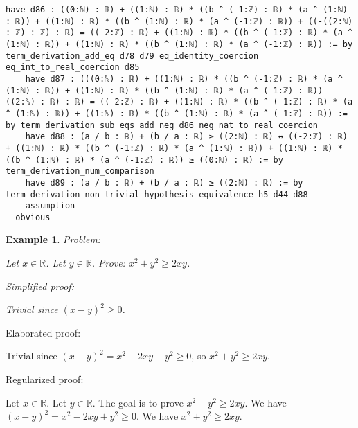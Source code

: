 \documentclass{article}
\newtheorem{example}{Example}
\begin{document}
\begin{tcolorbox}[colback=white!10, width=\linewidth]
\begin{lstlisting}[language=Lean4]
    have d86 : ((0:ℕ) : ℝ) + ((1:ℕ) : ℝ) * ((b ^ (-1:ℤ) : ℝ) * (a ^ (1:ℕ) : ℝ)) + ((1:ℕ) : ℝ) * ((b ^ (1:ℕ) : ℝ) * (a ^ (-1:ℤ) : ℝ)) + ((-((2:ℕ) : ℤ) : ℤ) : ℝ) = ((-2:ℤ) : ℝ) + ((1:ℕ) : ℝ) * ((b ^ (-1:ℤ) : ℝ) * (a ^ (1:ℕ) : ℝ)) + ((1:ℕ) : ℝ) * ((b ^ (1:ℕ) : ℝ) * (a ^ (-1:ℤ) : ℝ)) := by term_derivation_add_eq d78 d79 eq_identity_coercion eq_int_to_real_coercion d85
    have d87 : (((0:ℕ) : ℝ) + ((1:ℕ) : ℝ) * ((b ^ (-1:ℤ) : ℝ) * (a ^ (1:ℕ) : ℝ)) + ((1:ℕ) : ℝ) * ((b ^ (1:ℕ) : ℝ) * (a ^ (-1:ℤ) : ℝ)) - ((2:ℕ) : ℝ) : ℝ) = ((-2:ℤ) : ℝ) + ((1:ℕ) : ℝ) * ((b ^ (-1:ℤ) : ℝ) * (a ^ (1:ℕ) : ℝ)) + ((1:ℕ) : ℝ) * ((b ^ (1:ℕ) : ℝ) * (a ^ (-1:ℤ) : ℝ)) := by term_derivation_sub_eqs_add_neg d86 neg_nat_to_real_coercion
    have d88 : (a / b : ℝ) + (b / a : ℝ) ≥ ((2:ℕ) : ℝ) ↔ ((-2:ℤ) : ℝ) + ((1:ℕ) : ℝ) * ((b ^ (-1:ℤ) : ℝ) * (a ^ (1:ℕ) : ℝ)) + ((1:ℕ) : ℝ) * ((b ^ (1:ℕ) : ℝ) * (a ^ (-1:ℤ) : ℝ)) ≥ ((0:ℕ) : ℝ) := by term_derivation_num_comparison
    have d89 : (a / b : ℝ) + (b / a : ℝ) ≥ ((2:ℕ) : ℝ) := by term_derivation_non_trivial_hypothesis_equivalence h5 d44 d88
    assumption
  obvious

\end{lstlisting}
\end{tcolorbox}


\begin{example}
Problem:
\begin{tcolorbox}[colback=yellow!10, width=\linewidth]
Let $x\in\mathbb{R}$. Let $y\in\mathbb{R}$.
    Prove: $x^2 + y^2 \ge 2xy$.
\end{tcolorbox}

Simplified proof:
\begin{tcolorbox}[colback=blue!10, width=\linewidth]
Trivial since $(x-y)^2 \ge 0$.
\end{tcolorbox}
\end{example}

Elaborated proof:
\begin{tcolorbox}[colback=green!10, width=\linewidth]
Trivial since $(x-y)^2 = x^2 -2xy + y^2 \ge 0$, so $x^2 + y^2 \ge 2xy$.
\end{tcolorbox}

Regularized proof:
\begin{tcolorbox}[colback=red!10, width=\linewidth]
Let $x\in\mathbb{R}$.
Let $y\in\mathbb{R}$.
The goal is to prove $x^2 + y^2 \ge 2xy$.
We have ${{(x-y)}}^2 = x^2 -2xy + y^2 \ge 0$.
We have $x^2 + y^2 \ge 2xy$.
\end{tcolorbox}
\end{document}

